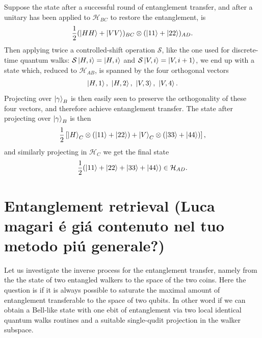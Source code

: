 \documentclass[
aps, pra, authorblock, superscriptaddress, twocolumn,
	10pt]{revtex4-1}
\newcommand{\parTitle}[1]{\noindent{\color{Mahogany}(\emph{#1})}}
\newcommand{\calH}{{\mathcal{H}}}
\newcommand{\calS}{{\mathcal{S}}}
\begin{document}
\parTitle{Example 1} Suppose the state after a successful round of entanglement transfer, and after a unitary has been applied to $\calH_{BC}$ to restore the entanglement, is
\begin{equation}
    \frac12 (\ket{HH} + \ket{VV})_{BC} \otimes (\ket{11} + \ket{22})_{AD}.
\end{equation}
Then applying twice a controlled-shift operation $\calS$, like the one used for discrete-time quantum walks: $\calS\ket{H,i}=\ket{H,i}$ and $\calS\ket{V,i}=\ket{V,i+1}$, we end up with a state which, reduced to $\calH_{AB}$, is spanned by the four orthogonal vectors
\begin{equation}
    \ket{H,1}, \,\,\ket{H,2}, \,\,\ket{V,3}, \,\,\ket{V,4}.
\end{equation}
Projecting over $\ket{\gamma}_B$ is then easily seen to preserve the orthogonality of these four vectors, and therefore achieve entanglement transfer.
The state after projecting over $\ket{\gamma}_B$ is then
\begin{equation}
    \frac12\left[
        \ket{H}_C\otimes(\ket{11}+\ket{22}) +
        \ket{V}_C\otimes(\ket{33} + \ket{44})
    \right],
\end{equation}
and similarly projecting in $\calH_C$ we get the final state
\begin{equation}
    \frac12 (\ket{11} + \ket{22} + \ket{33} + \ket{44}) \in\calH_{AD}.
\end{equation}

\appendix

\section{Entanglement retrieval (Luca magari \'e gi\'a contenuto nel tuo metodo pi\'u generale?)}

Let us investigate the inverse process for the entanglement transfer, namely from the the state of two entangled walkers to the space of the two coins. Here the question is if it is always possible to saturate the maximal amount of entanglement transferable to the space of two qubits. In other word if we can obtain a Bell-like state with one ebit of entanglement via two local identical quantum walks routines and a suitable single-qudit projection in the walker subspace. 
\end{document}
